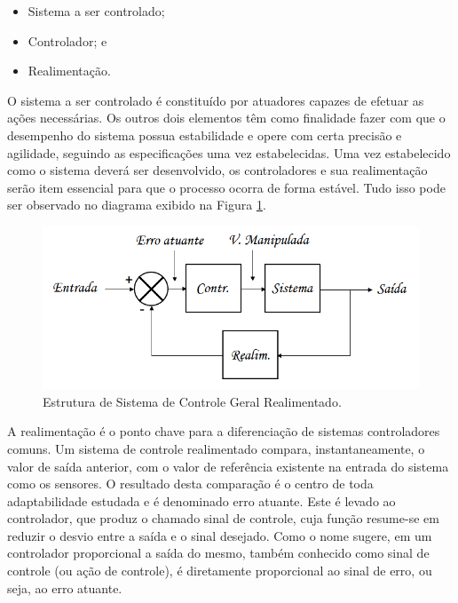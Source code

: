 \documentclass[portugues, brazil, a4paper,12pt]{article}
\begin{document}
		\begin{itemize}
			\item Sistema a ser controlado;
			\item Controlador; e
			\item Realimentação.
		\end{itemize}

		O sistema a ser controlado é constituído por atuadores capazes de efetuar as ações necessárias. Os outros dois elementos têm como finalidade fazer com que o desempenho do sistema possua estabilidade e opere com certa precisão e agilidade, seguindo as especificações uma vez estabelecidas. Uma vez estabelecido como o sistema deverá ser desenvolvido, os controladores e sua realimentação serão item essencial para que o processo ocorra de forma estável. Tudo isso pode ser observado no diagrama exibido na Figura \ref{fig:estrutura_sistema_controle}.

		\begin{figure}[H]
			\centering
			\includegraphics[width=\linewidth]{img/math-realimentacao.png}
			\caption{Estrutura de Sistema de Controle Geral Realimentado.}
			\label{fig:estrutura_sistema_controle}
		\end{figure}

		A realimentação é o ponto chave para a diferenciação de sistemas controladores comuns. Um sistema de controle realimentado compara, instantaneamente, o valor de saída anterior, com o valor de referência existente na entrada do sistema como os sensores. O resultado desta comparação é o centro de toda adaptabilidade estudada e é denominado erro atuante. Este é levado ao controlador, que produz o chamado sinal de controle, cuja função resume-se em reduzir o desvio entre a saída e o sinal desejado. Como o nome sugere, em um controlador proporcional a saída do mesmo, também conhecido como sinal de controle (ou ação de controle), é diretamente proporcional ao sinal de erro, ou seja, ao erro atuante.
\end{document}
